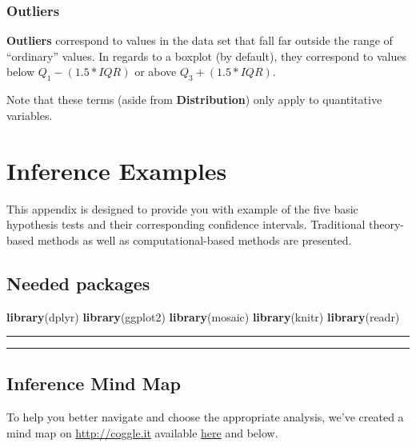 \documentclass[]{tufte-book}
\newenvironment{Shaded}{\begin{snugshade}}{\end{snugshade}}
\newcommand{\KeywordTok}[1]{\textcolor[rgb]{0.13,0.29,0.53}{\textbf{{#1}}}}
\newcommand{\NormalTok}[1]{{#1}}
\let\oldrule=\rule
\renewcommand{\rule}[1]{\oldrule{\linewidth}}
\begin{document}
\subsection{Outliers}\label{outliers}

\textbf{Outliers} correspond to values in the data set that fall far
outside the range of ``ordinary'' values. In regards to a boxplot (by
default), they correspond to values below \(Q_1 - (1.5 * IQR)\) or above
\(Q_3 + (1.5 * IQR)\).

Note that these terms (aside from \textbf{Distribution}) only apply to
quantitative variables.

\chapter{Inference Examples}\label{appendixB}

This appendix is designed to provide you with example of the five basic
hypothesis tests and their corresponding confidence intervals.
Traditional theory-based methods as well as computational-based methods
are presented.

\section*{Needed packages}\label{needed-packages-7}

\begin{Shaded}
\begin{Highlighting}[]
\KeywordTok{library}\NormalTok{(dplyr)}
\KeywordTok{library}\NormalTok{(ggplot2)}
\KeywordTok{library}\NormalTok{(mosaic)}
\KeywordTok{library}\NormalTok{(knitr)}
\KeywordTok{library}\NormalTok{(readr)}
\end{Highlighting}
\end{Shaded}

\begin{center}\rule{0.5\linewidth}{\linethickness}\end{center}

\begin{center}\rule{0.5\linewidth}{\linethickness}\end{center}

\section{Inference Mind Map}\label{inference-mind-map}

To help you better navigate and choose the appropriate analysis, we've
created a mind map on \url{http://coggle.it} available
\href{https://coggle.it/diagram/Vxlydu1akQFeqo6-}{here} and below.
\end{document}

